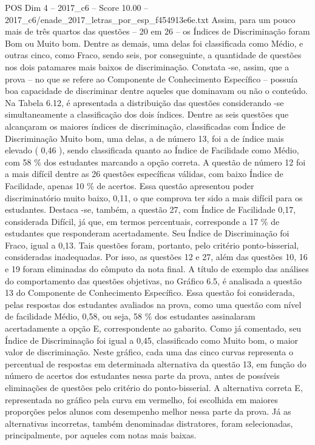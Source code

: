\begin{textsample}{POS Dim 4 – 2017\_c6 – Score 10.00 – 2017\_c6/enade\_2017\_letras\_por\_esp\_f454913e6e.txt}
Assim, para um pouco mais de três quartos das questões – 20 em 26 – os Índices de Discriminação foram Bom ou Muito bom.
Dentre as demais, uma delas foi classificada como Médio, e outras cinco, como Fraco, sendo seis, por conseguinte, a quantidade de questões nos dois patamares mais baixos de discriminação.
Constata -se, assim, que a prova – no que se refere ao Componente de Conhecimento Específico – possuía boa capacidade de discriminar dentre aqueles que dominavam ou não o conteúdo.
Na Tabela 6.12, é apresentada a distribuição das questões considerando -se simultaneamente a classificação dos dois índices.
Dentre as seis questões que alcançaram os maiores índices de discriminação, classificadas com Índice de Discriminação Muito bom, uma delas, a de número 13, foi a de índice mais elevado ( 0,46 ), sendo classificada quanto ao Índice de Facilidade como Médio, com 58 \% dos estudantes marcando a opção correta.
A questão de número 12 foi a mais difícil dentre as 26 questões específicas válidas, com baixo Índice de Facilidade, apenas 10 \% de acertos.
Essa questão apresentou poder discriminatório muito baixo, 0,11, o que comprova ter sido a mais difícil para os estudantes.
Destaca -se, também, a questão 27, com Índice de Facilidade 0,17, considerada Difícil, já que, em termos percentuais, corresponde a 17 \% de estudantes que responderam acertadamente.
Seu Índice de Discriminação foi Fraco, igual a 0,13.
Tais questões foram, portanto, pelo critério ponto-bisserial, consideradas inadequadas.
Por isso, as questões 12 e 27, além das questões 10, 16 e 19 foram eliminadas do cômputo da nota final.
A título de exemplo das análises do comportamento das questões objetivas, no Gráfico 6.5, é analisada a questão 13 do Componente de Conhecimento Específico.
Essa questão foi considerada, pelas respostas dos estudantes avaliados na prova, como uma questão com nível de facilidade Médio, 0,58, ou seja, 58 \% dos estudantes assinalaram acertadamente a opção E, correspondente ao gabarito.
Como já comentado, seu Índice de Discriminação foi igual a 0,45, classificado como Muito bom, o maior valor de discriminação.
Neste gráfico, cada uma das cinco curvas representa o percentual de respostas em determinada alternativa da questão 13, em função do número de acertos dos estudantes nessa parte da prova, antes de possíveis eliminações de questões pelo critério do ponto-bisserial.
A alternativa correta E, representada no gráfico pela curva em vermelho, foi escolhida em maiores proporções pelos alunos com desempenho melhor nessa parte da prova.
Já as alternativas incorretas, também denominadas distratores, foram selecionadas, principalmente, por aqueles com notas mais baixas.

\end{textsample}
